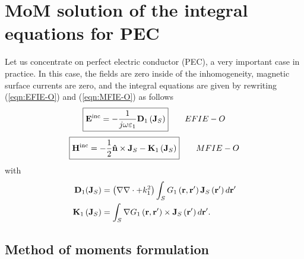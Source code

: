 \chapter{MoM solution of the integral equations for PEC}
%
\par
Let us concentrate on perfect electric conductor (PEC), a very important case in practice. In this case, the fields are zero inside of the inhomogeneity, magnetic surface currents are zero, and the integral equations are given by rewriting (\ref{eqn:EFIE-O}) and (\ref{eqn:MFIE-O}) as follows
\begin{equation}\label{eqn:EFIE-O_PEC}
\boxed{
\mathbf{E}^\text{inc} =  - \frac{1}{j \omega \varepsilon_1} \mathbf{D}_1 \left( \mathbf{J}_{S}\right) 
} \qquad EFIE-O
\end{equation}
\begin{equation}\label{eqn:MFIE-O_PEC}
\boxed{
\mathbf{H}^\text{inc} = - \frac{1}{2} \mathbf{\hat{n}} \times \mathbf{J}_{S} - \mathbf{K}_1 \left(\mathbf{J}_{S}\right)
} \qquad MFIE-O
\end{equation}
with
\begin{align*}
\mathbf{D}_1\!\left(\mathbf{J}_S\right) &= \left(\nabla \nabla \cdot + k_1^2\right) \int_{S} G_1\left(\mathbf{r}, \mathbf{r}'\right) \mathbf{J}_S\left(\mathbf{r}'\right) d\mathbf{r}' \\
\mathbf{K}_1\left(\mathbf{J}_S\right) &= \int_S \nabla G_1\left(\mathbf{r}, \mathbf{r}'\right) \times \mathbf{J}_S\left(\mathbf{r}'\right) d\mathbf{r}'.
\end{align*}


\section{Method of moments formulation}


